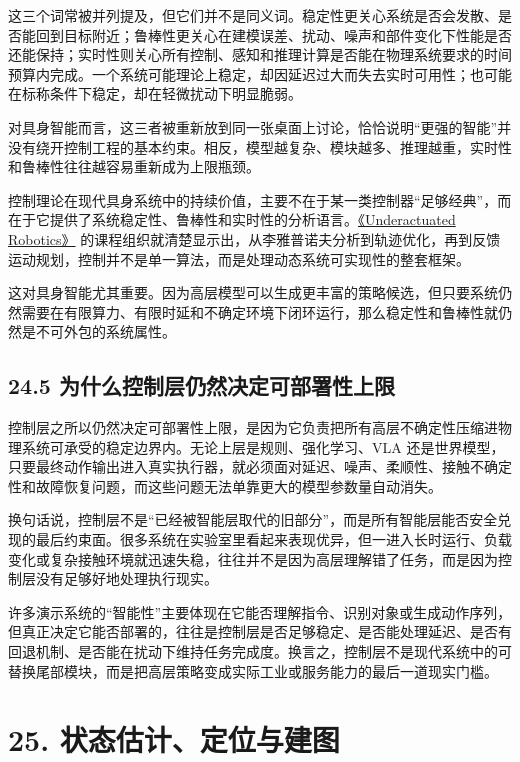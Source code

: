 这三个词常被并列提及，但它们并不是同义词。稳定性更关心系统是否会发散、是否能回到目标附近；鲁棒性更关心在建模误差、扰动、噪声和部件变化下性能是否还能保持；实时性则关心所有控制、感知和推理计算是否能在物理系统要求的时间预算内完成。一个系统可能理论上稳定，却因延迟过大而失去实时可用性；也可能在标称条件下稳定，却在轻微扰动下明显脆弱。

对具身智能而言，这三者被重新放到同一张桌面上讨论，恰恰说明“更强的智能”并没有绕开控制工程的基本约束。相反，模型越复杂、模块越多、推理越重，实时性和鲁棒性往往越容易重新成为上限瓶颈。

控制理论在现代具身系统中的持续价值，主要不在于某一类控制器“足够经典”，而在于它提供了系统稳定性、鲁棒性和实时性的分析语言。\href{https://underactuated.mit.edu/}{《Underactuated Robotics》} 的课程组织就清楚显示出，从李雅普诺夫分析到轨迹优化，再到反馈运动规划，控制并不是单一算法，而是处理动态系统可实现性的整套框架。

这对具身智能尤其重要。因为高层模型可以生成更丰富的策略候选，但只要系统仍然需要在有限算力、有限时延和不确定环境下闭环运行，那么稳定性和鲁棒性就仍然是不可外包的系统属性。

\subsection*{24.5 为什么控制层仍然决定可部署性上限}


控制层之所以仍然决定可部署性上限，是因为它负责把所有高层不确定性压缩进物理系统可承受的稳定边界内。无论上层是规则、强化学习、VLA 还是世界模型，只要最终动作输出进入真实执行器，就必须面对延迟、噪声、柔顺性、接触不确定性和故障恢复问题，而这些问题无法单靠更大的模型参数量自动消失。

换句话说，控制层不是“已经被智能层取代的旧部分”，而是所有智能层能否安全兑现的最后约束面。很多系统在实验室里看起来表现优异，但一进入长时运行、负载变化或复杂接触环境就迅速失稳，往往并不是因为高层理解错了任务，而是因为控制层没有足够好地处理执行现实。

许多演示系统的“智能性”主要体现在它能否理解指令、识别对象或生成动作序列，但真正决定它能否部署的，往往是控制层是否足够稳定、是否能处理延迟、是否有回退机制、是否能在扰动下维持任务完成度。换言之，控制层不是现代系统中的可替换尾部模块，而是把高层策略变成实际工业或服务能力的最后一道现实门槛。

\section*{25. 状态估计、定位与建图}


